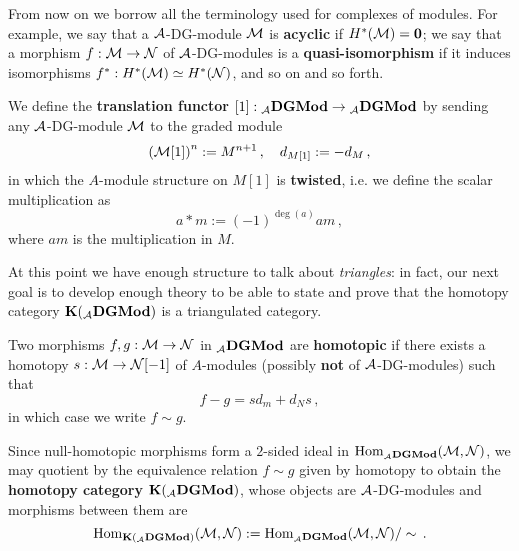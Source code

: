 	From now on we borrow all the terminology used for complexes of modules. 
	For example, we say that a $\mathcal{A}$-DG-module $\mathcal{M}$ is \textbf{acyclic} 
	if $H^{*}(\mathcal{M}) = {\normalfont\textbf{0}}$;
	we say that a morphism $f:\mathcal{M} \to \mathcal{N}$ of $\mathcal{A}$-DG-modules 
	is a \textbf{quasi-isomorphism} if it induces isomorphisms 
	$f^*:H^{*}(\mathcal{M}) \simeq H^{*}(\mathcal{N})$, and so on and so forth.
	
	\begin{df}
		We define the \textbf{translation functor} 
		$[1] : {}_{\mathcal{A}}{\normalfont\textbf{DGMod}} \to {}_{\mathcal{A}}{\normalfont\textbf{DGMod}}$
		by sending any $\mathcal{A}$-DG-module $\mathcal{M}$ to the graded module
		\begin{equation*}
			\left( \mathcal{M}[1] \right)^{n} := M^{n+1}\,,
			\quad d_{M[1]} := -d_{M}\,,
		\end{equation*}
		in which the $A$-module structure on $M[1]$ is \textbf{twisted},
		i.e. we define the scalar multiplication as
		\begin{equation*}
			a \ast m := (-1)^{\deg(a)} am\,,
		\end{equation*}
		where $am$ is the multiplication in $M$.
	\end{df}
	
	
	At this point we have enough structure to talk about \emph{triangles}:
	in fact, our next goal is to develop enough theory to be able
	to state and prove that the homotopy category ${\normalfont\textbf{K}}({}_{\mathcal{A}}{\normalfont\textbf{DGMod}})$
	is a triangulated category.
	
	
	\begin{df}
		Two morphisms $f,g: \mathcal{M} \to \mathcal{N}$ in ${}_{\mathcal{A}}{\normalfont\textbf{DGMod}}$
		are \textbf{homotopic} if there exists a homotopy
		$s:\mathcal{M} \to \mathcal{N}[-1]$ of $A$-modules (possibly \textbf{not} of $\mathcal{A}$-DG-modules)
		such that $$f-g=sd_{m} + d_{N}s\,,$$
		in which case we write $f \sim g$.
	\end{df}
	
	Since null-homotopic morphisms form a $2$-sided ideal in 
	$\operatorname{Hom}_{{}_{\mathcal{A}}{\normalfont\textbf{DGMod}}}(\mathcal{M},\mathcal{N})$, we may quotient
	by the equivalence relation $f \sim g$ given by homotopy
	to obtain the \textbf{homotopy category} ${\normalfont\textbf{K}}({}_{\mathcal{A}}{\normalfont\textbf{DGMod}})$,
	whose objects are $\mathcal{A}$-DG-modules and morphisms between them are
	\begin{equation*}
		\operatorname{Hom}_{{\normalfont\textbf{K}}({}_{\mathcal{A}}{\normalfont\textbf{DGMod}})}(\mathcal{M},\mathcal{N}) := \operatorname{Hom}_{{}_{\mathcal{A}}{\normalfont\textbf{DGMod}}}(\mathcal{M},\mathcal{N})/\sim\,.
	\end{equation*}
	
